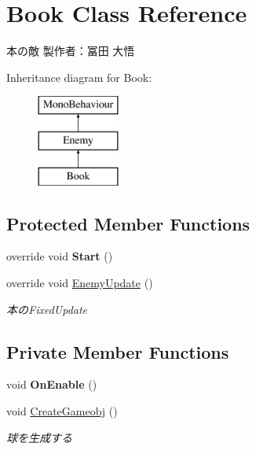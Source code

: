 \hypertarget{class_book}{}\section{Book Class Reference}
\label{class_book}


本の敵 製作者：冨田 大悟  


Inheritance diagram for Book\+:\begin{figure}[H]
\begin{center}
\leavevmode
\includegraphics[height=3.000000cm]{class_book}
\end{center}
\end{figure}
\subsection*{Protected Member Functions}
\begin{DoxyCompactItemize}
\item 
\mbox{\label{class_book_a2c559caf9034d31263a9a9118ef48a26}} 
override void {\bfseries Start} ()
\item 
override void \hyperlink{class_book_ad838b454ccd9f8c4e88215aa220226a4}{Enemy\+Update} ()
\begin{DoxyCompactList}\small\item\em 本の\+Fixed\+Update \end{DoxyCompactList}\end{DoxyCompactItemize}
\subsection*{Private Member Functions}
\begin{DoxyCompactItemize}
\item 
\mbox{\label{class_book_a79094da09cd65678df094ab0058b5ee5}} 
void {\bfseries On\+Enable} ()
\item 
void \hyperlink{class_book_afa98fd4c4380e34a2d2e231ad0836d7c}{Create\+Gameobj} ()
\begin{DoxyCompactList}\small\item\em 球を生成する \end{DoxyCompactList}\end{DoxyCompactItemize}
